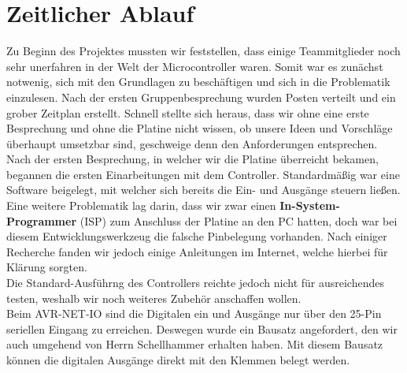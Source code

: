 \chapter{Zeitlicher Ablauf}
Zu Beginn des Projektes mussten wir feststellen, dass einige Teammitglieder noch sehr 
unerfahren in der Welt der Microcontroller waren. Somit war es zunächst notwenig, sich mit 
den Grundlagen zu beschäftigen und sich in die Problematik einzulesen. Nach der ersten Gruppenbesprechung 
wurden Posten verteilt und ein grober Zeitplan erstellt. Schnell stellte sich 
heraus, dass wir ohne eine erste Besprechung und ohne die Platine nicht wissen, ob unsere 
Ideen und Vorschläge überhaupt umsetzbar sind, geschweige denn den Anforderungen entsprechen. \\
Nach der ersten Besprechung, in welcher wir die Platine überreicht bekamen, begannen die ersten
 Einarbeitungen mit dem Controller. Standardmäßig war eine Software beigelegt, mit welcher sich 
 bereits die Ein- und Ausgänge steuern ließen. \\
 Eine weitere Problematik lag darin, dass wir zwar einen \textbf{In-System-Programmer} (ISP) zum 
Anschluss der Platine an den PC hatten, doch war bei diesem Entwicklungswerkzeug
die falsche Pinbelegung vorhanden. Nach einiger Recherche fanden wir jedoch einige Anleitungen 
im Internet, welche hierbei für Klärung sorgten.\\
Die Standard-Ausführng des Controllers reichte jedoch nicht für ausreichendes testen, weshalb wir 
noch weiteres Zubehör anschaffen wollen.\\
Beim AVR-NET-IO sind die Digitalen ein und Ausgänge nur über den 25-Pin seriellen Eingang zu erreichen.
Deswegen wurde ein Bausatz angefordert, den wir auch umgehend von Herrn Schellhammer erhalten haben.
Mit diesem Bausatz können die digitalen Ausgänge direkt mit den Klemmen belegt werden.





%
